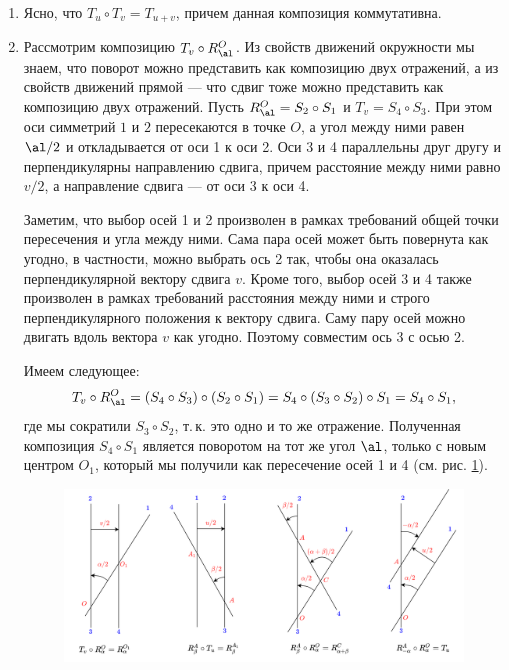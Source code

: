 \begin{enumerate}
\item Ясно, что $T_u\circ T_v=T_{u+v}$, причем данная композиция коммутативна.

\item Рассмотрим композицию $T_v\circ R_\al^O$. Из свойств движений окружности мы знаем, что поворот можно представить как композицию двух отражений, а из свойств движений прямой --- что сдвиг тоже можно представить как композицию двух отражений. Пусть $R_\al^O=S_2\circ S_1$ и $T_v=S_4\circ S_3$. При этом оси симметрий $1$ и $2$ пересекаются в точке $O$, а угол между ними равен $\al/2$ и откладывается от оси 1 к оси 2. Оси 3 и 4 параллельны друг другу и перпендикулярны направлению сдвига, причем расстояние между ними равно $v/2$, а направление сдвига --- от оси 3 к оси 4.

Заметим, что выбор осей 1 и 2 произволен в рамках требований общей точки пересечения и угла между ними. Сама пара осей может быть повернута как угодно, в частности, можно выбрать ось 2 так, чтобы она оказалась перпендикулярной вектору сдвига $v$. Кроме того, выбор осей 3 и 4 также произволен в рамках требований расстояния между ними и строго перпендикулярного положения к вектору сдвига. Саму пару осей можно двигать вдоль вектора $v$ как угодно. Поэтому совместим ось 3 с осью 2.

Имеем следующее:
$$
T_v\circ R_\al^O = (S_4\circ S_3)\circ (S_2\circ S_1) = S_4\circ (S_3\circ S_2)\circ S_1 = S_4\circ S_1,
$$
где мы сократили $S_3\circ S_2$, т.\,к. это одно и то же отражение. Полученная композиция $S_4\circ S_1$ является поворотом на тот же угол $\al$, только с новым центром $O_1$, который мы получили как пересечение осей 1 и 4 (см. рис. \ref{plane_transit}).
\begin{figure}[hbt!]
\begin{center}
\includegraphics[scale=0.2]{plane_transit.png}
\end{center}\caption{}\label{plane_transit}
\end{figure}


\end{enumerate}
